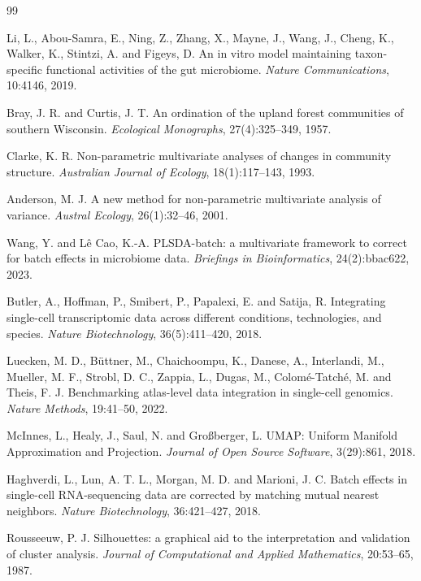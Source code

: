 \documentclass[11pt,letterpaper]{article}
\begin{document}
\begin{thebibliography}{99}

Li, L., Abou-Samra, E., Ning, Z., Zhang, X., Mayne, J., Wang, J., Cheng, K., Walker, K., Stintzi, A. and Figeys, D.
An in vitro model maintaining taxon-specific functional activities of the gut microbiome.
\textit{Nature Communications}, 10:4146, 2019.

Bray, J. R. and Curtis, J. T.
An ordination of the upland forest communities of southern Wisconsin.
\textit{Ecological Monographs}, 27(4):325--349, 1957.

Clarke, K. R.
Non-parametric multivariate analyses of changes in community structure.
\textit{Australian Journal of Ecology}, 18(1):117--143, 1993.

Anderson, M. J.
A new method for non-parametric multivariate analysis of variance.
\textit{Austral Ecology}, 26(1):32--46, 2001.

Wang, Y. and L{\^e} Cao, K.-A.
PLSDA-batch: a multivariate framework to correct for batch effects in microbiome data.
\textit{Briefings in Bioinformatics}, 24(2):bbac622, 2023.

Butler, A., Hoffman, P., Smibert, P., Papalexi, E. and Satija, R.
Integrating single-cell transcriptomic data across different conditions, technologies, and species.
\textit{Nature Biotechnology}, 36(5):411--420, 2018.

Luecken, M. D., B{\"u}ttner, M., Chaichoompu, K., Danese, A., Interlandi, M., Mueller, M. F., Strobl, D. C., Zappia, L., Dugas, M., Colom{\'e}-Tatch{\'e}, M. and Theis, F. J.
Benchmarking atlas-level data integration in single-cell genomics.
\textit{Nature Methods}, 19:41--50, 2022.

McInnes, L., Healy, J., Saul, N. and Gro{\ss}berger, L.
UMAP: Uniform Manifold Approximation and Projection.
\textit{Journal of Open Source Software}, 3(29):861, 2018.

Haghverdi, L., Lun, A. T. L., Morgan, M. D. and Marioni, J. C.
Batch effects in single-cell RNA-sequencing data are corrected by matching mutual nearest neighbors.
\textit{Nature Biotechnology}, 36:421--427, 2018.

Rousseeuw, P. J.
Silhouettes: a graphical aid to the interpretation and validation of cluster analysis.
\textit{Journal of Computational and Applied Mathematics}, 20:53--65, 1987.

\end{thebibliography}
\end{document}
